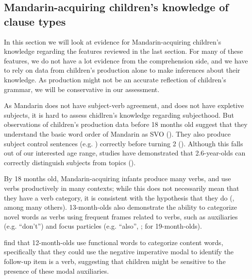 \subsection{Mandarin-acquiring children's knowledge of clause types}
\label{sec:mancl:bg:child}
In this section we will look at evidence for Mandarin-acquiring children's knowledge regarding the features reviewed in the last section. For many of these features, we do not have a lot evidence from the comprehension side, and we have to rely on data from children's production alone to make inferences about their knowledge. As production might not be an accurate reflection of children's grammar, we will be conservative in our assessment.   

   As Mandarin does not have subject-verb agreement, and does not have expletive subjects, it is hard to assess chidlren's knowledge regarding subjecthood. But observations of children's production data before 18 months old suggest that they understand the basic word order of Mandarin as SVO (\cite{tardif1993verb,tardif1996verb}). They also produce subject control sentences (e.g. ) correctly before turning 2 (\cite{yang2015control}). Although this falls out of our interested age range, studies have demonstrated that 2.6-year-olds can correctly distinguish subjects from topics (\cite{chien1985subj}). 

 By 18 months old, Mandarin-acquiring infants produce many verbs, and use verbs productively in many contexts; while this does not necessarily mean that they have a verb category, it is consistent with the hypothesis that they do (\cite{tardif1993verb,tardif1996verb, xiaolee2006,zhangshili2015infant}, among many others). 13-month-olds also demonstrate the ability to categorize novel words as verbs using frequent frames related to verbs, such as auxiliaries (e.g.  ``don't'') and focus particles (e.g.  ``also'', \cite{zhangshili2015infant}; \cite{ying2021func} for 19-month-olds).

  \cite{zhangshili2015infant} find that 12-month-olds use functional words to categorize content words, specifically that they could use the negative imperative modal  to identify the follow-up item is a verb, suggesting that children might be sensitive to the presence of these modal auxiliaries.  %


